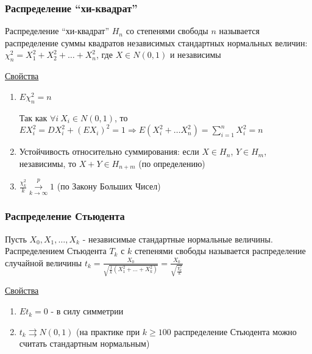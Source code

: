 \documentclass[12pt]{article}
\begin{document}
\subsubsection{Распределение \enquote{хи-квадрат}}

\Def Распределение \enquote{хи-квадрат} $H_n$ со степенями свободы $n$ называется распределение
суммы квадратов независимых стандартных нормальных величин: $\chi^2_n = X_1^2 + X_2^2 + \dots + X_n^2$, 
где $X \in N(0, 1)$ и независимы

\underline{Свойства}

\begin{enumerate}
    \item $E\chi^2_n = n$

    \begin{MyProof}
        Так как $\forall i \ X_i \in N(0, 1)$, то $E X_i^2 = D X_i^2 + (EX_i)^2 = 1 \Longrightarrow E(X_i^2 + \dots X_n^2) = \sum_{i = 1}^n X_i^2 = n$
    \end{MyProof}

    \item Устойчивость относительно суммирования: если $X \in H_n$, $Y \in H_m$, независимы, то $X + Y \in H_{n + m}$ (по определению) 


    \item $\frac{\chi_k^2}{k} \overset{p}{\underset{k \to \infty}{\longrightarrow}} 1$ (по Закону Больших Чисел)
\end{enumerate}

\subsubsection{Распределение Стьюдента}

\Def Пусть $X_0, X_1, \dots, X_k$ - независимые стандартные нормальные величины. 
Распределением Стьюдента $T_k$ с $k$ степенями свободы называется распределение случайной величины 
$t_k = \frac{X_0}{\sqrt{\frac{1}{k} (X_1^2 + \dots + X_k^2)}} = \frac{X_0}{\sqrt{\frac{\chi_k^2}{k}}}$

\underline{Свойства}

\begin{enumerate}
    \item $Et_k = 0$ - в силу симметрии

    \item $t_k \rightrightarrows N(0, 1)$ (на практике при $k \geq 100$ распределение Стьюдента можно считать стандартным нормальным)
\end{enumerate}
\end{document}
